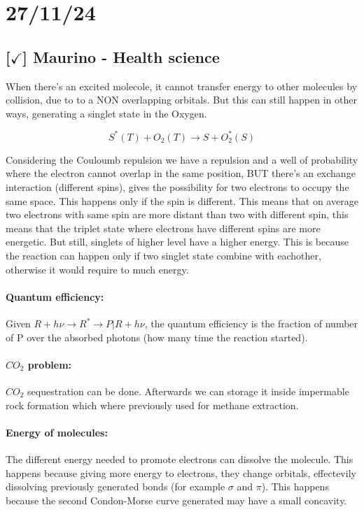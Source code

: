 \section{27/11/24}

\subsection{[$\checkmark$] Maurino - Health science}

When there's an excited molecole, it cannot transfer energy to other molecules by collision, due to to a NON overlapping orbitals. But this can still happen in other ways, generating a singlet state in the Oxygen.

$$S^*(T) + O_2(T) \rightarrow S + O_2^*(S)$$

Considering the Couloumb repulsion we have a repulsion and a well of probability where the electron cannot overlap in the same position, BUT there's an exchange interaction (different spins), gives the possibility for two electrons to occupy the same space. This happens only if the spin is different. This means that on average two electrons with same spin are more distant than two with different spin, this means that the triplet state where electrons have different spins are more energetic. But still, singlets of higher level have a higher energy. This is because the reaction can happen only if two singlet state combine with eachother, otherwise it would require to much energy.

\paragraph{Quantum efficiency:} Given $R + h\nu \rightarrow R^* \rightarrow P | R + h\nu$, the quantum efficiency is the fraction of number of P over the absorbed photons (how many time the reaction started).

\paragraph{$CO_2$ problem:} $CO_2$ sequestration can be done. Afterwards we can storage it inside impermable rock formation which where previously used for methane extraction.

\paragraph{Energy of molecules:} The different energy needed to promote electrons can dissolve the molecule. This happens because giving more energy to electrons, they change orbitals, effectevily dissolving previously generated bonds (for example $\sigma$ and $\pi$). This happens because the second Condon-Morse curve generated may have a small concavity.